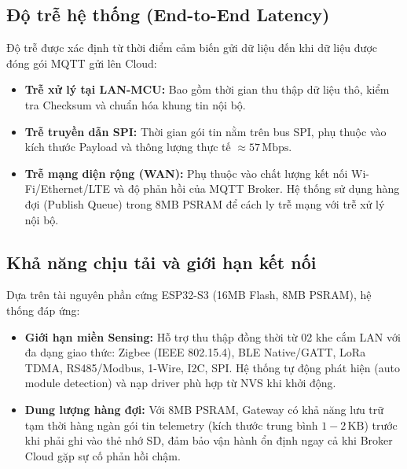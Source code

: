 \subsection{Độ trễ hệ thống (End-to-End Latency)}
Độ trễ được xác định từ thời điểm cảm biến gửi dữ liệu đến khi dữ liệu được đóng gói MQTT gửi lên Cloud:
\begin{itemize}
    \item \textbf{Trễ xử lý tại LAN-MCU:} Bao gồm thời gian thu thập dữ liệu thô, kiểm tra Checksum và chuẩn hóa khung tin nội bộ.
    \item \textbf{Trễ truyền dẫn SPI:} Thời gian gói tin nằm trên bus SPI, phụ thuộc vào kích thước Payload và thông lượng thực tế $\approx 57\,\text{Mbps}$.
    \item \textbf{Trễ mạng diện rộng (WAN):} Phụ thuộc vào chất lượng kết nối Wi-Fi/Ethernet/LTE và độ phản hồi của MQTT Broker. Hệ thống sử dụng hàng đợi (Publish Queue) trong 8MB PSRAM để cách ly trễ mạng với trễ xử lý nội bộ.
\end{itemize}

\subsection{Khả năng chịu tải và giới hạn kết nối}
Dựa trên tài nguyên phần cứng ESP32-S3 (16MB Flash, 8MB PSRAM), hệ thống đáp ứng:
\begin{itemize}
    \item \textbf{Giới hạn miền Sensing:} Hỗ trợ thu thập đồng thời từ 02 khe cắm LAN với đa dạng giao thức: Zigbee (IEEE 802.15.4), BLE Native/GATT, LoRa TDMA, RS485/Modbus, 1-Wire, I2C, SPI. Hệ thống tự động phát hiện (auto module detection) và nạp driver phù hợp từ NVS khi khởi động.
    \item \textbf{Dung lượng hàng đợi:} Với 8MB PSRAM, Gateway có khả năng lưu trữ tạm thời hàng ngàn gói tin telemetry (kích thước trung bình $1-2 \, \text{KB}$) trước khi phải ghi vào thẻ nhớ SD, đảm bảo vận hành ổn định ngay cả khi Broker Cloud gặp sự cố phản hồi chậm.
\end{itemize}